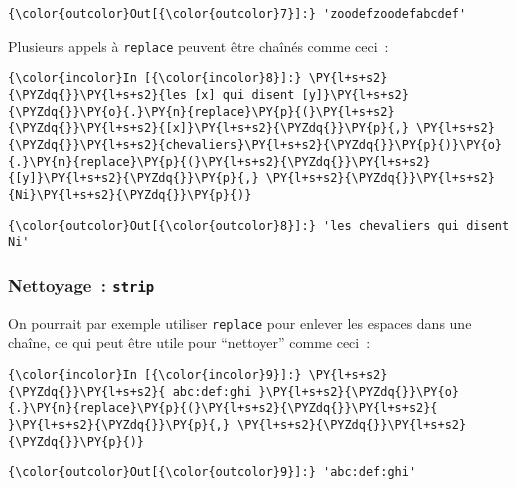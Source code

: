 \begin{Verbatim}[commandchars=\\\{\}]
{\color{outcolor}Out[{\color{outcolor}7}]:} 'zoodefzoodefabcdef'
\end{Verbatim}
            
    Plusieurs appels à \texttt{replace} peuvent être chaînés comme ceci~:

    \begin{Verbatim}[commandchars=\\\{\}]
{\color{incolor}In [{\color{incolor}8}]:} \PY{l+s+s2}{\PYZdq{}}\PY{l+s+s2}{les [x] qui disent [y]}\PY{l+s+s2}{\PYZdq{}}\PY{o}{.}\PY{n}{replace}\PY{p}{(}\PY{l+s+s2}{\PYZdq{}}\PY{l+s+s2}{[x]}\PY{l+s+s2}{\PYZdq{}}\PY{p}{,} \PY{l+s+s2}{\PYZdq{}}\PY{l+s+s2}{chevaliers}\PY{l+s+s2}{\PYZdq{}}\PY{p}{)}\PY{o}{.}\PY{n}{replace}\PY{p}{(}\PY{l+s+s2}{\PYZdq{}}\PY{l+s+s2}{[y]}\PY{l+s+s2}{\PYZdq{}}\PY{p}{,} \PY{l+s+s2}{\PYZdq{}}\PY{l+s+s2}{Ni}\PY{l+s+s2}{\PYZdq{}}\PY{p}{)}
\end{Verbatim}


\begin{Verbatim}[commandchars=\\\{\}]
{\color{outcolor}Out[{\color{outcolor}8}]:} 'les chevaliers qui disent Ni'
\end{Verbatim}
            
    \hypertarget{nettoyage-strip}{%
\subsubsection{\texorpdfstring{Nettoyage~:
\texttt{strip}}{Nettoyage~: strip}}\label{nettoyage-strip}}

    On pourrait par exemple utiliser \texttt{replace} pour enlever les
espaces dans une chaîne, ce qui peut être utile pour ``nettoyer'' comme
ceci~:

    \begin{Verbatim}[commandchars=\\\{\}]
{\color{incolor}In [{\color{incolor}9}]:} \PY{l+s+s2}{\PYZdq{}}\PY{l+s+s2}{ abc:def:ghi }\PY{l+s+s2}{\PYZdq{}}\PY{o}{.}\PY{n}{replace}\PY{p}{(}\PY{l+s+s2}{\PYZdq{}}\PY{l+s+s2}{ }\PY{l+s+s2}{\PYZdq{}}\PY{p}{,} \PY{l+s+s2}{\PYZdq{}}\PY{l+s+s2}{\PYZdq{}}\PY{p}{)}
\end{Verbatim}


\begin{Verbatim}[commandchars=\\\{\}]
{\color{outcolor}Out[{\color{outcolor}9}]:} 'abc:def:ghi'
\end{Verbatim}
            
